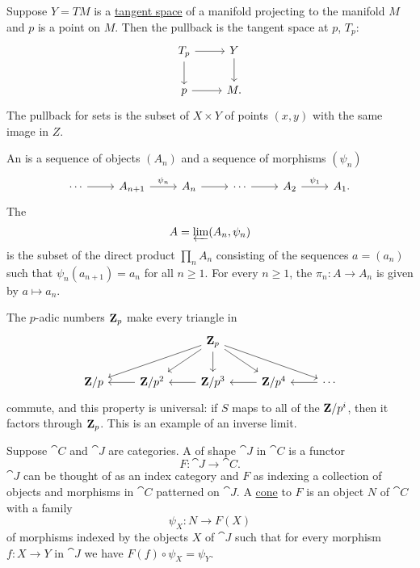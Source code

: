 \documentclass[11pt, oneside]{article}
\begin{document}
Suppose $Y=TM$ is a \href{https://en.wikipedia.org/wiki/Tangent_space}{\color{black}tangent space} of a manifold projecting to the manifold $M$ and $p$ is a point on $M$. Then the pullback is the tangent space at $p$, $T_p$:
\[
\begin{tikzcd}
T_p \arrow[r] \arrow[d]& Y \arrow[d]\\
p\arrow[r]&M.
\end{tikzcd}
\]
The pullback for sets is the subset of $X\times Y$ of points $(x,y)$ with the same image in $Z$.

An  is a sequence of objects $(A_n)$ and a sequence of morphisms $(\psi_n)$ 
\[
\begin{tikzcd}
\cdots \arrow[r]  & A_{n+1}\arrow[r, "\psi_n"] & A_n \arrow[r] &\cdots \arrow[r]  & A_2 \arrow[r, "\psi_1"] & A_1.
\end{tikzcd}
\]
The \href{https://en.wikipedia.org/wiki/Inverse_limit}{} 
\[
A = \varprojlim (A_n, \psi_n)
\]
is the subset of the direct product $\prod_n A_n$ consisting of the sequences $a=(a_n)$ such that $\psi_n(a_{n+1}) = a_n$ for all $n\ge 1$. For every $n\ge 1$, the  $\pi_n : A \longrightarrow A_n$ is given by $a \longmapsto a_n$.

The $p$-adic numbers $\mathbf Z_p$ make every triangle in 
\[
\begin{tikzcd}
&&\Z_p \arrow[dll]\arrow[dl] \arrow[d]\arrow[dr] \arrow[drr] &&\\
\Z/p & \Z/p^2 \arrow[l] & \Z/p^3 \arrow[l] & \Z/p^4\arrow[l]  & \cdots \arrow[l]
\end{tikzcd}
\]
commute, and this property is universal: if $S$ maps to all of the $\mathbf Z/p^i$, then it factors through $\mathbf Z_p$. This is an example of an inverse limit.

Suppose $\cat C$ and $\cat J$ are categories. A \href{https://en.wikipedia.org/wiki/Diagram_(category_theory)}{} of shape $\cat J$ in $\cat C$ is a functor 
$$
F : \cat J \longrightarrow \cat C.
$$
$\cat J$ can be thought of as an index category and $F$ as indexing a collection of objects and morphisms in $\cat C$ patterned on $\cat J$. A \href{https://en.wikipedia.org/wiki/Cone_(category_theory)}{\color{black}cone} to $F$ is an object $N$ of $\cat C$ with a family
$$
\psi_X : N \longrightarrow F(X)
$$
of morphisms indexed by the objects $X$ of $\cat J$ such that for every morphism $f:X\longrightarrow Y$ in $\cat J$ we have $F(f) \circ \psi_X = \psi_Y$.
\end{document}
